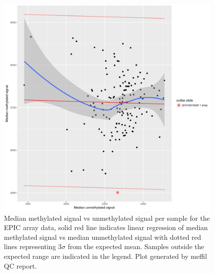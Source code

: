 \documentclass[
]{book}
\begin{document}
\begin{figure}

{\centering \includegraphics[width=0.8\linewidth]{figs/MAVIDOSqcEPICmethVsUnmeth} 

}

\caption{Median methylated signal vs unmethylated signal per sample for the EPIC array data, solid red line indicates linear regression of median methylated signal vs median unmethylated signal with dotted red lines representing \(3\sigma\) from the expected mean. Samples outside the expected range are indicated in the legend. Plot generated by meffil QC report.}\label{fig:MAVIDOSqcEPICmethVsUnmeth}
\end{figure}
\end{document}

